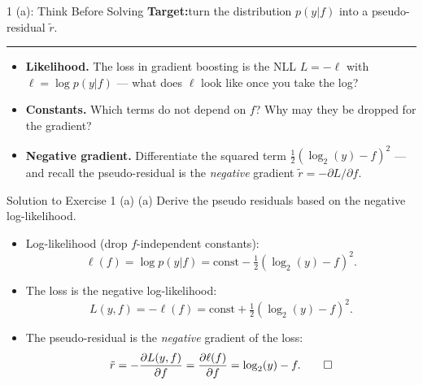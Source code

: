\documentclass[aspectratio=169]{beamer}
\newcommand{\recall}[1]{%
	\setlength{\fboxsep}{5pt}%
	\colorbox{blue!10}{\footnotesize #1}}
\begin{document}
\begin{frame}{1 (a): Think Before Solving}
	\small
	\textbf{Target:}\quad turn the distribution $p(y|f)$ into a pseudo-residual $\tilde r$.
	\rule{\linewidth}{0.4pt}
	\vspace{4pt}
	\begin{itemize}
		\setlength{\itemsep}{9pt}
		\item<1-> \textbf{Likelihood.} The loss in gradient boosting is the NLL $L = -\ell$ with $\ell = \log p(y|f)$ --- what does $\ell$ look like once you take the log?
		\item<2-> \textbf{Constants.} Which terms do not depend on $f$? Why may they be dropped for the gradient?
		\item<3-> \textbf{Negative gradient.} Differentiate the squared term $\tfrac12(\log_2(y)-f)^2$ --- and recall the pseudo-residual is the \emph{negative} gradient $\tilde r = -\partial L / \partial f$.
	\end{itemize}
	\vspace{2pt}
	\uncover<3->{\centering\recall{$p(y|f) \to \ell(f) \to L = -\ell \to \tilde r = -\partial L/\partial f$}}
\end{frame}

\begin{frame}{Solution to Exercise 1 (a)}
	\small
	(a) Derive the pseudo residuals based on the negative log-likelihood.
	\setlength{\jot}{3pt}
	\begin{itemize}
		\setlength{\itemsep}{8pt}
		\item<1-> Log-likelihood (drop $f$-independent constants):
			$$\ell(f) = \log p(y|f) = \text{const} - \tfrac12 (\log_2(y) - f)^2.$$
		\item<2-> The loss is the negative log-likelihood:
			$$L(y, f) = - \ell(f) = \text{const} + \tfrac12 (\log_2(y) - f)^2.$$
		\item<3-> The pseudo-residual is the \emph{negative} gradient of the loss:
			$$\tilde{r} = - \frac{\partial L(y,f)}{\partial f} = \frac{\partial \ell(f)}{\partial f} = \log_2(y) - f. \hfill\qed$$
	\end{itemize}
\end{frame}
\end{document}

